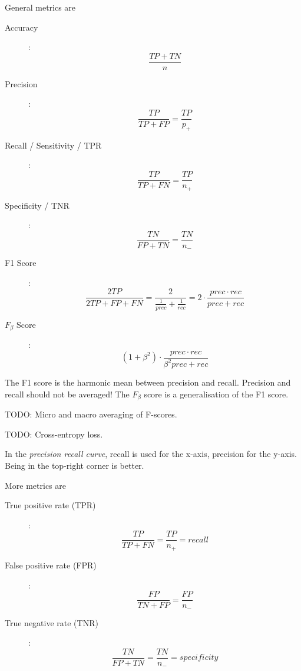 General metrics are
\begin{description}
    \item[Accuracy]: \begin{equation*}
        \frac{TP + TN}{n}
    \end{equation*}
    \item[Precision]: \begin{equation*}
        \frac{TP}{TP + FP} = \frac{TP}{p_{+}}
    \end{equation*}
    \item[Recall / Sensitivity / TPR]: \begin{equation*}
        \frac{TP}{TP + FN} = \frac{TP}{n_{+}}
    \end{equation*}
    \item[Specificity / TNR]: \begin{equation*}
        \frac{TN}{FP + TN} = \frac{TN}{n_{-}}
    \end{equation*}
    \item[F1 Score]: \begin{equation*}
        \frac{2TP}{2TP + FP + FN} = \frac{2}{\frac{1}{prec} + \frac{1}{rec}} = 2 \cdot \frac{prec \cdot rec}{prec + rec}
    \end{equation*}
    \item[$F_\beta$ Score]: \begin{equation*}
        (1 + \beta^2) \cdot \frac{prec \cdot rec}{\beta^2 prec + rec}
    \end{equation*}
\end{description}
The F1 score is the
harmonic mean between precision and recall.
Precision and recall should not be averaged!
The $F_\beta$ score is a generalisation of the
F1 score.

TODO: Micro and macro averaging of F-scores.

TODO: Cross-entropy loss.

In the \emph{precision recall curve},
recall is used for the x-axis, precision for the y-axis.
Being in the top-right corner is better.

More metrics are
\begin{description}
    \item[True positive rate (TPR)]: \begin{equation*}
        \frac{TP}{TP + FN} = \frac{TP}{n_{+}} = recall
    \end{equation*}
    \item[False positive rate (FPR)]: \begin{equation*}
        \frac{FP}{TN + FP} = \frac{FP}{n_{-}}
    \end{equation*}
    \item[True negative rate (TNR)]: \begin{equation*}
        \frac{TN}{FP + TN} = \frac{TN}{n_{-}} = specificity
    \end{equation*}
\end{description}

